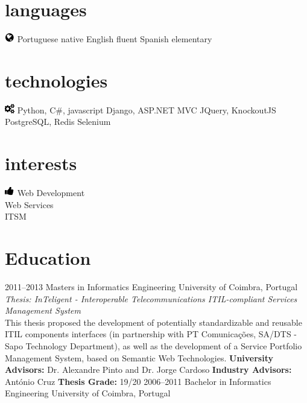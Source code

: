 \documentclass[]{friggeri-cv} %
\begin{document}
\begin{aside}
\section{languages}
\includegraphics[scale=0.5, left]{globe.png}
\vspace{-5mm} Portuguese native
English fluent
Spanish elementary
\section{technologies}
\includegraphics[scale=0.5, left]{cogs.png}
\vspace{-5mm}  Python, C\#, javascript
Django, ASP.NET MVC
JQuery, KnockoutJS
PostgreSQL, Redis
Selenium
\section{interests}
\includegraphics[scale=0.5, left]{like.png}
\vspace{-5mm} Web Development\\ Web Services \\ ITSM
\end{aside}





\section{Education}

\begin{entrylist}
\entrymasters
{2011--2013}
{Masters {\normalfont in Informatics Engineering}}
{University of Coimbra, Portugal}
{\emph{Thesis: InTeligent - Interoperable Telecommunications ITIL-compliant Services Management System} \\ This thesis proposed the development of potentially standardizable and reusable ITIL components interfaces (in partnership with PT Comunicações, SA/DTS - Sapo Technology Department), as well as the development of a Service Portfolio Management System, based on Semantic Web Technologies.}
{\textbf{University Advisors:} Dr. Alexandre Pinto and Dr. Jorge Cardoso}
{\textbf{Industry Advisors:} António Cruz}
{\textbf{Thesis Grade:} 19/20}
\entrybachelor
{2006--2011}
{Bachelor {\normalfont in Informatics Engineering}}
{University of Coimbra, Portugal}
\end{entrylist}
\end{document}
